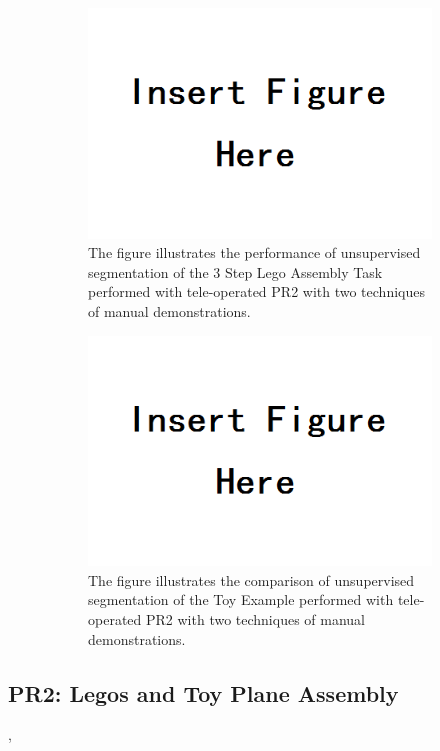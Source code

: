 \begin{figure}[ht!]
	\centering
	\begin{subfigure}[t]{3.4in}
	    \centering
        \includegraphics[width=0.5\linewidth]{figures/insert}
		\caption{The figure illustrates the performance of unsupervised segmentation of the 3 Step Lego Assembly Task performed with tele-operated PR2 with two techniques of manual demonstrations.}
		\vspace{-5pt}
	\end{subfigure}
	 \hspace{0.1in}
	\begin{subfigure}[t]{3.4in}
	    \centering
		\includegraphics[width=0.5\linewidth]{figures/insert}
		\caption{The figure illustrates the comparison of unsupervised segmentation of the Toy Example performed with tele-operated PR2 with two techniques of manual demonstrations.}
		\vspace{-5pt}
	\end{subfigure}
	\caption{}
	\vspace{-15pt}
\end{figure}

\subsection{PR2: Legos and Toy Plane Assembly}
, 


